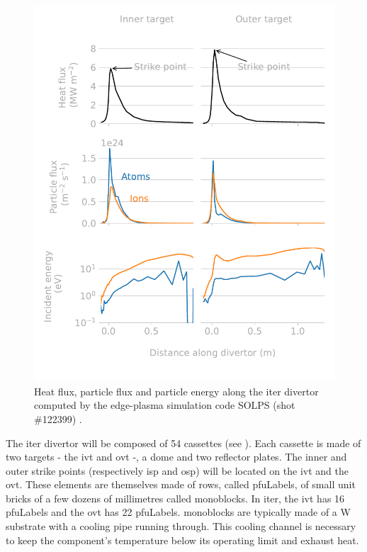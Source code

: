 \begin{figure} [h]
    \centering
    \includegraphics[width=\linewidth]{Figures/Chapter1/divertor_exposure_conditions.pdf}
    \caption{Heat flux, particle flux and particle energy along the \acrshort{iter} divertor computed by the edge-plasma simulation code SOLPS (shot \#122399) \cite{pitts_physics_2019}.}
\end{figure}

The \acrshort{iter} divertor will be composed of 54 cassettes (see ).
Each cassette is made of two targets - the \gls{ivt} and \gls{ovt} -, a dome and two reflector plates.
The inner and outer \glspl{strike point} (respectively \acrshort{isp} and \acrshort{osp}) will be located on the \gls{ivt} and the \gls{ovt}.
These elements are themselves made of rows, called \glspl{pfuLabel}, of small unit bricks of a few dozens of millimetres called \glspl{monoblock}.
In \acrshort{iter}, the \gls{ivt} has 16 \glspl{pfuLabel} and the \gls{ovt} has 22 \glspl{pfuLabel}.
\Glspl{monoblock} are typically made of a \Gls{W} substrate with a cooling pipe running through.
This cooling channel is necessary to keep the component's temperature below its operating limit and exhaust heat.

